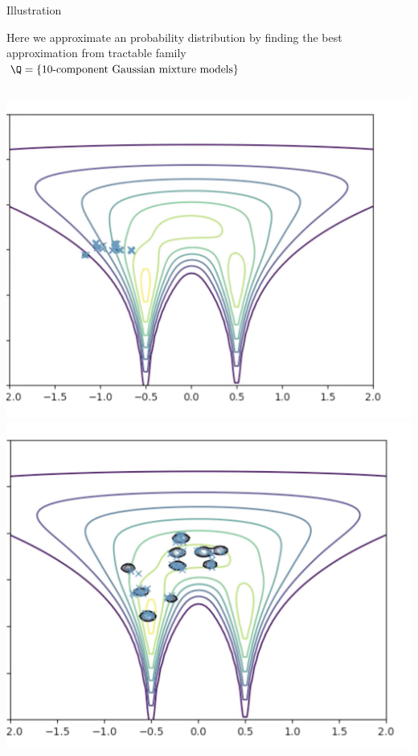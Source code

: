 \documentclass[10pt]{beamer}
\begin{document}


\begin{frame}{Illustration}

 \begin{minipage}[t][.9\textheight]{\textwidth}
  
Here we approximate an probability distribution by finding the best approximation from tractable family $\Q = \{ \text{10-component Gaussian mixture models} \}$ 

\begin{columns}[t]
\centering
\includegraphics[width=.7\textwidth]{images/intro_animation_1.png}\\
\includegraphics[width=.7\textwidth]{images/intro_animation_2.png}
\centering

\end{columns}
\end{minipage}
\end{frame}
\end{document}
